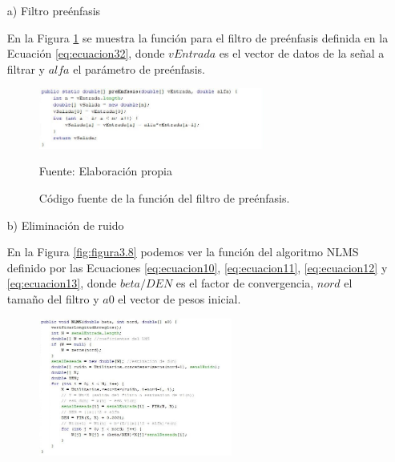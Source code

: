 \begin{enumerate}
\item[a)]Filtro preénfasis
\par
En la Figura \ref{fig:figura3.10} se muestra la función para el filtro de preénfasis definida en la Ecuación \eqref{eq:ecuacion32}, donde $vEntrada$ es el vector de datos de la señal a filtrar y $alfa$ el parámetro de preénfasis.
\begin{figure}[H]
\captionsetup{justification=centering}
\begin{center}
\includegraphics[width=0.7\textwidth]{Imagenes/Cap3/image010}
\end{center}
\begin{center}
\vskip -0.5cm
\caption{\small{Código fuente de la función del filtro de preénfasis.}}
\label{fig:figura3.10}
{\small{Fuente: Elaboración propia}}
\end{center}
\end{figure}
\vskip -0.5cm
\item[b)]Eliminación de ruido
\par
En la Figura \ref{fig:figura3.8} podemos ver la función del algoritmo NLMS definido por las Ecuaciones \eqref{eq:ecuacion10}, \eqref{eq:ecuacion11}, \eqref{eq:ecuacion12} y \eqref{eq:ecuacion13}, donde $beta/DEN$ es el factor de convergencia, $nord$ el tamaño del filtro y $a0$ el vector de pesos inicial.
\begin{figure}[H]
\captionsetup{justification=centering}
\begin{center}
\includegraphics[width=0.6\textwidth]{Imagenes/Cap3/image008}
\end{center}
\begin{center}
\vskip -0.5cm

\end{center}
\end{figure}
\end{enumerate}
